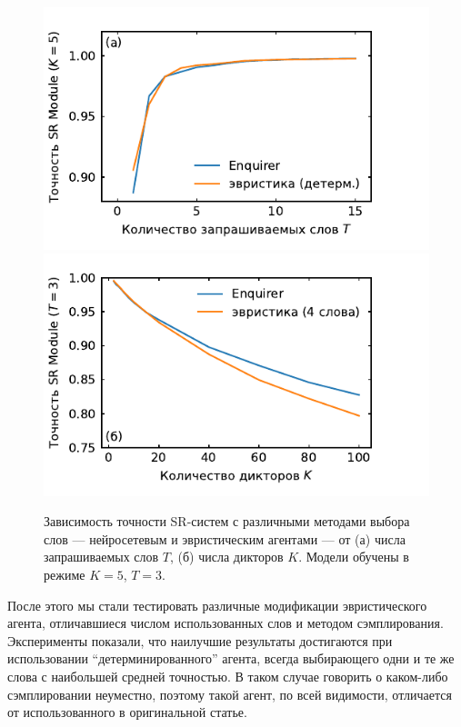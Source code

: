\begin{figure}[!h]
    \centering
    \includegraphics[scale=\pltscale]{../plots/word_sweep_heuristic.pdf}
    \includegraphics[scale=\pltscale]{../plots/guest_sweep_heuristic.pdf}
    \caption{Зависимость точности SR-систем с различными методами выбора слов
    --- нейросетевым и эвристическим агентами --- от (а) числа запрашиваемых
    слов $T$, (б) числа дикторов $K$. Модели обучены в режиме $K = 5$, $T = 3$.}
\end{figure}

После этого мы стали тестировать различные модификации эвристического агента,
отличавшиеся числом использованных слов и методом сэмплирования. Эксперименты
показали, что наилучшие результаты достигаются при использовании
``детерминированного'' агента, всегда выбирающего одни и те же слова с
наибольшей средней точностью.  В таком случае говорить о каком-либо
сэмплировании неуместно, поэтому такой агент, по всей видимости, отличается от
использованного в оригинальной статье.


